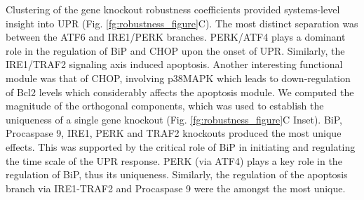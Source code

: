 \documentclass[fleqn,10pt]{wlscirep}
\begin{document}

Clustering of the gene knockout robustness coefficients provided systems-level insight into UPR (Fig. \ref{fg:robustness_figure}C).
The most distinct separation was between the ATF6 and IRE1/PERK branches.
PERK/ATF4 plays a dominant role in the regulation of BiP and CHOP upon the onset of UPR.
Similarly, the IRE1/TRAF2 signaling axis induced apoptosis.
Another interesting functional module was that of CHOP, involving p38MAPK which leads to down-regulation of Bcl2 levels which considerably affects the apoptosis module.
We computed the magnitude of the orthogonal components, which was used to establish the uniqueness of a single gene knockout (Fig. \ref{fg:robustness_figure}C Inset).
BiP, Procaspase 9, IRE1, PERK and TRAF2 knockouts produced the most unique effects.
This was supported by the critical role of BiP in initiating and regulating the time scale of the UPR response.
PERK (via ATF4) plays a key role in the regulation of BiP, thus its uniqueness.
Similarly, the regulation of the apoptosis branch via IRE1-TRAF2 and Procaspase 9 were the amongst the most unique.

\end{document}
